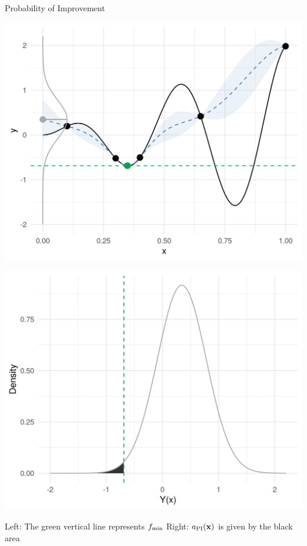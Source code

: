 \documentclass[11pt,compress,t,notes=noshow, xcolor=table]{beamer}
\begin{document}
\begin{vbframe}{Probability of Improvement}
\begin{minipage}[b]{0.45\textwidth}
  \includegraphics[width = \textwidth]{figure_man/bayesian_loop_sm_normal_fmin.png}
\end{minipage}
\hfill
\begin{minipage}[b]{0.45\textwidth}
  \includegraphics[width = \textwidth]{figure_man/bayesian_loop_pi_0.png}
\end{minipage}

\begin{footnotesize}
Left: The green vertical line represents $f_{\min}$ Right: $a_{\text{PI}}(\mathbf{x})$ is given by the black area
\end{footnotesize}


\end{vbframe}
\end{document}
